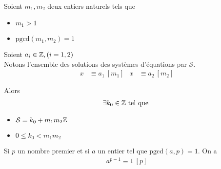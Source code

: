 \begin{graybox}
    \begin{theoreme}
        Soient $m_1, m_2$ deux entiers naturels tels que 
        \begin{itemize}
            \item $m_1 > 1$
            \item $\mathrm{pgcd}(m_1, m_2) = 1$
        \end{itemize}
        Soient $a_i \in \mathbb{Z}, (i = 1, 2)$
        \\
        Notons l'ensemble des solutions des systèmes d'équations par $\mathcal{S}$.
        \begin{align*}
            x &\equiv a_1 \ [m_1] & x &\equiv a_2 \ [m_2]
        \end{align*}
    \end{theoreme}
    Alors 
    \begin{align*}
        \exists k_0 \in \mathbb{Z} \text{ tel que } 
    \end{align*}
    \begin{itemize}
        \item $\mathcal{S} = k_0 + m_1 m_2 \mathbb{Z}$
        \item $0 \leq k_0 < m_1 m_2$
    \end{itemize}
\end{graybox}

\begin{graybox}
\begin{theoreme}
Si $p$ un nombre premier et si $a$ un entier tel que $\mathrm{pgcd}(a, p) = 1$. On a 
\begin{align*}
a^{p- 1} \equiv 1 \ [p]
\end{align*}
\end{theoreme}
\end{graybox}

